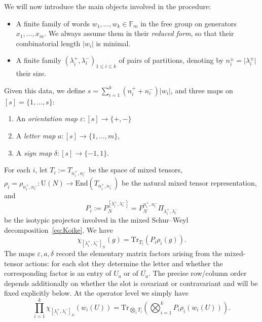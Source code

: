 \documentclass[11pt,a4paper,reqno]{article}
\theoremstyle{definition}
\theoremstyle{remark}
\newcommand\U{{\mathrm U}}
\newcommand\Tr{\mathrm{Tr}}
\newcommand\End{{\mathrm{End}}}
\newcommand\Fbb{{\mathbb{F}}}
\begin{document}
We will now introduce the main objects involved in the procedure:
\begin{itemize}
\item A finite family of words $w_1,\ldots,w_k\in\Fbb_m$ in the free group on generators $x_1,\ldots,x_m$. We always assume them in their \emph{reduced form}, so that their combinatorial length $\vert w_i\vert$ is minimal.
\item A finite family $(\lambda_i^+,\lambda_i^-)_{1\leq i\leq k}$ of pairs of partitions, denoting by $n_i^\pm=\vert \lambda_i^\pm\vert$ their size.
\end{itemize}
Given this data, we define $s=\sum_{i=1}^k(n_i^++n_i^-)\vert w_i\vert$, and three maps on $[s]=\{1,\ldots,s\}$:
\begin{enumerate}
\item An \emph{orientation map} $\varepsilon:[s]\to\{+,-\}$
\item A \emph{letter map} $a:[s]\to\{1,\ldots,m\}$,
\item A \emph{sign map} $\delta:[s]\to\{-1,1\}$.
\end{enumerate}
For each $i$, let $T_i:=T_{n_i^+,n_i^-}$ be the space of mixed tensors, $\rho_i=\rho_{n_i^+,n_i^-}:\U(N)\to\End(T_{n_i^+,n_i^-})$ be the natural mixed tensor representation, and
\[
P_i:=P_N^{[\lambda_i^+,\lambda_i^-]}=P_N^{n_i^+,n_i^-}\Pi_{\lambda_i^+,\lambda_i^-}
\]
be the isotypic projector involved in the mixed Schur--Weyl decomposition~\eqref{eq:Koike}. We have
\begin{equation}\label{eq:Koike_character}
\chi_{[\lambda_i^+,\lambda_i^-]_N}(g)=\Tr_{T_i}(P_i\rho_i(g)).
\end{equation}
The maps $\varepsilon,a,\delta$ record the elementary matrix factors arising from the mixed-tensor actions: for each slot they determine the letter and whether the corresponding factor is an entry of $U_a$ or of $\overline{U_a}$.  The precise row/column order depends additionally on whether the slot is covariant or contravariant and will be fixed explicitly below.  At the operator level we simply have
\begin{equation}\label{eq:character_tensor}
\prod_{i=1}^k \chi_{[\lambda_i^+,\lambda_i^-]_N}(w_i(U))
=\Tr_{\bigotimes_i T_i}\!\left(\bigotimes_{i=1}^k P_i\rho_i(w_i(U))\right).
\end{equation}
\end{document}
